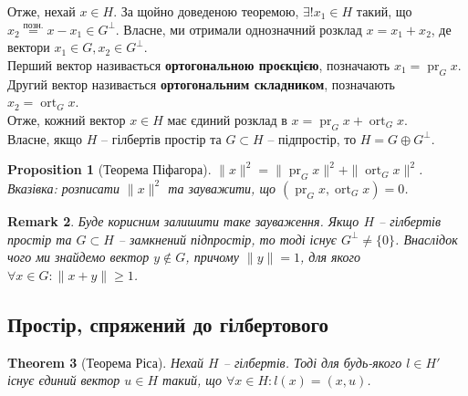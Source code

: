 \documentclass[a4paper, 10pt]{article}
\theoremstyle{theoremdd}
\newtheorem{theorem}{Theorem}[subsection]
\theoremstyle{theoremdd}
\theoremstyle{theoremdd}
\theoremstyle{theoremdd}
\theoremstyle{theoremdd}
\newtheorem{proposition}[theorem]{Proposition}
\theoremstyle{theoremdd}
\newtheorem{remark}[theorem]{Remark}
\theoremstyle{theoremdd}
\theoremstyle{theoremdd}
\DeclareMathOperator{\ort}{ort}
\DeclareMathOperator{\pr}{pr}
\begin{document}
\noindent
Отже, нехай $x \in H$. За щойно доведеною теоремою, $\exists ! x_1 \in H$ такий, що $x_2 \overset{\text{позн.}}{=} x - x_1 \in G^\perp$. Власне, ми отримали однозначний розклад $x = x_1 + x_2$, де вектори $x_1 \in G, x_2 \in G^\perp$.\\
Перший вектор називається \textbf{ортогональною проєкцією}, позначають $x_1 = \pr_G x$.\\
Другий вектор називається \textbf{ортогональним складником}, позначають $x_2 = \ort_G x$.\\
Отже, кожний вектор $x \in H$ має єдиний розклад в $x = \pr_G x + \ort_G x$.
\bigskip \\
Власне, якщо $H$ -- гілбертів простір та $G \subset H$ -- підпростір, то $H = G \oplus G^\perp$.

\begin{proposition}[Теорема Піфагора]
$\|x\|^2 = \|\pr_G x\|^2 + \|\ort_G x\|^2$.\\
\textit{Вказівка: розписати $\|x\|^2$ та зауважити, що $(\pr_G x, \ort_G x) = 0$.}
\end{proposition}

\begin{remark}
\label{equivalent_existence_of_orthogonal_unit_vector}
Буде корисним залишити таке зауваження. Якщо $H$ -- гілбертів простір та $G \subset H$ -- замкнений підпростір, то тоді існує $G^\perp \neq \{0\}$. Внаслідок чого ми знайдемо вектор $y \notin G$, причому $\|y\|=  1$, для якого $\forall x \in G: \|x+y\| \geq 1$.
\end{remark}

\subsection{Простір, спряжений до гілбертового}
\begin{theorem}[Теорема Ріса]
Нехай $H$ -- гілбертів. Тоді для будь-якого $l \in H'$ існує єдиний вектор $u \in H$ такий, що $\forall x \in H: l(x) = (x,u)$.
\end{theorem}
\end{document}
